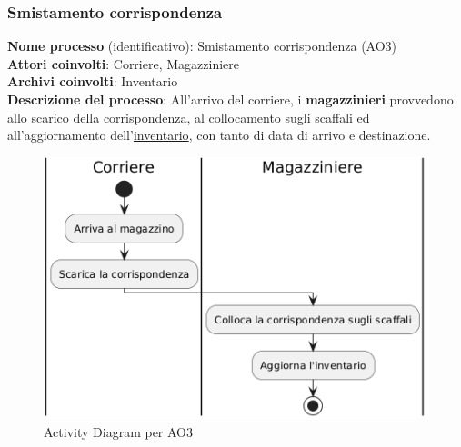 \documentclass[a4paper,12pt]{article}
\begin{document}
\subsubsection{Smistamento corrispondenza}
\textbf{Nome processo} (identificativo): Smistamento corrispondenza (AO3)\\
\textbf{Attori coinvolti}: Corriere, Magazziniere \\
\textbf{Archivi coinvolti}: Inventario \\
\textbf{Descrizione del processo}: All'arrivo del corriere, i \textbf{magazzinieri} provvedono allo scarico della corrispondenza, al collocamento sugli scaffali ed
all'aggiornamento dell'\underline{inventario}, con tanto di data di arrivo e destinazione. \\
\begin{figure}[H]
  \centering
  \includegraphics[width=0.8\linewidth]{assets/activitydiagram_AO3.png}
	\caption{Activity Diagram per AO3}
\end{figure}
\end{document}
